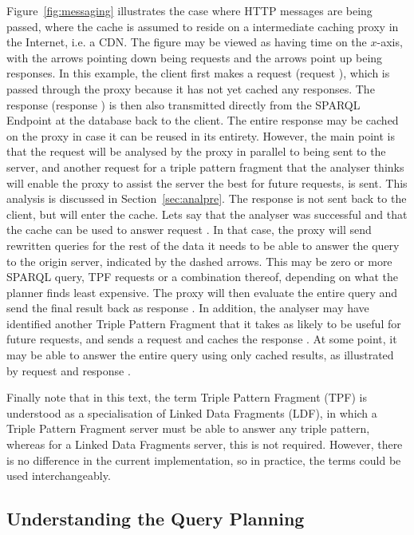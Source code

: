 Figure~\ref{fig:messaging} illustrates the case where HTTP messages
are being passed, where the cache is assumed to reside on a
intermediate caching proxy in the Internet, i.e. a CDN. The figure
may be viewed as having time on the $x$-axis, with the arrows pointing
down being requests and the arrows point up being responses. In this
example, the client first makes a request (request ), which
is passed through the proxy because it has not yet cached any
responses. The response (response ) is then also
transmitted directly from the SPARQL Endpoint at the database back to
the client. The entire response may be cached on the proxy in case it
can be reused in its entirety. However, the main point is that the
request will be analysed by the proxy in parallel to being sent to the
server, and another request  for a triple pattern fragment
that the analyser thinks will enable the proxy to assist the server
the best for future requests, is sent. This analysis is discussed in
Section~\ref{sec:analpre}. The response  is not sent back
to the client, but will enter the cache. Lets say that the analyser
was successful and that the cache can be used to answer request
. In that case, the proxy will send rewritten queries for
the rest of the data it needs to be able to answer the query to the
origin server, indicated by the dashed arrows. This may be zero or more SPARQL
query, TPF requests or a combination thereof, depending on what the
planner finds least expensive. The proxy will then evaluate the entire
query and send the final result back as response . In
addition, the analyser may have identified another Triple Pattern
Fragment that it takes as likely to be useful for future requests, and
sends a request and caches the response . At some point, it
may be able to answer the entire query using only cached results, as
illustrated by request and response .

Finally note that in this text, the term Triple Pattern Fragment (TPF)
is understood as a specialisation of Linked Data Fragments (LDF), in
which a Triple Pattern Fragment server must be able to answer any
triple pattern, whereas for a Linked Data Fragments server, this is
not required. However, there is no difference in the current
implementation, so in practice, the terms could be used
interchangeably.

\subsection{Understanding the Query Planning}\label{sec:understandquery}

